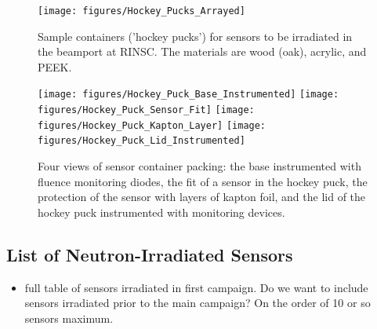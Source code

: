 \begin{figure}[!hbt]
  \begin{center}
    \texttt{[image: figures/Hockey\_Pucks\_Arrayed]}
    \caption{Sample containers ('hockey pucks') for sensors to be irradiated in the beamport at RINSC. The materials are wood (oak), acrylic, and PEEK.}
    \label{fig:Pucks_Arrayed}
  \end{center}
\end{figure}

  \begin{figure}[!hbt]
  \begin{center}
    \texttt{[image: figures/Hockey\_Puck\_Base\_Instrumented]}  
    \texttt{[image: figures/Hockey\_Puck\_Sensor\_Fit]}
    \texttt{[image: figures/Hockey\_Puck\_Kapton\_Layer]}
    \texttt{[image: figures/Hockey\_Puck\_Lid\_Instrumented]}    
    \caption{Four views of sensor container packing: the base instrumented with fluence monitoring diodes, the fit of a sensor in the hockey puck, the protection of the sensor with layers of kapton foil, and the lid of the hockey puck instrumented with monitoring devices.}
    \label{fig:Puck_Packing}
  \end{center}
\end{figure}

\subsection{List of Neutron-Irradiated Sensors}
\begin{itemize}
  \item full table of sensors irradiated in first campaign. Do we want to include sensors irradiated prior to the main campaign? On the order of 10 or so sensors maximum.
\end{itemize}
\label{subsec:sensors_irradiation}
